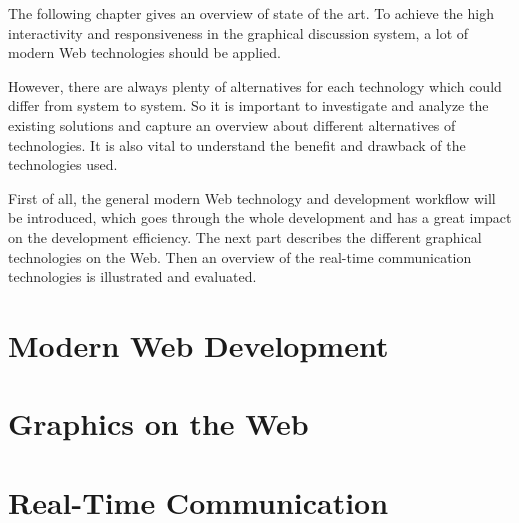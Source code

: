 The following chapter gives an overview of state of the art. To achieve the high interactivity and responsiveness in the graphical discussion system, a lot of modern Web technologies should be applied.

However, there are always plenty of alternatives for each technology which could differ from system to system. So it is important to investigate and analyze the existing solutions and capture an overview about different alternatives of technologies. It is also vital to understand the benefit and drawback of the technologies used.

First of all, the general modern Web technology and development workflow will be introduced, which goes through the whole development and has a great impact on the development efficiency. The next part describes the different graphical technologies on the Web. Then an overview of the real-time communication technologies is illustrated and evaluated.

\section{Modern Web Development}

\section{Graphics on the Web}
 \label{graphics-section}
\section{Real-Time Communication}

% 
% 


